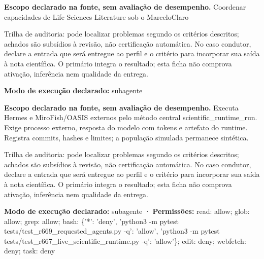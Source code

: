 \begin{descricao}
\textbf{Escopo declarado na fonte, sem avaliação de desempenho.}
Coordenar capacidades de Life Sciences Literature sob o MarceloClaro
\end{descricao}

\begin{funcao}
Trilha de auditoria: pode localizar problemas segundo os critérios descritos; achados são subsídios à revisão, não certificação automática. No caso condutor, declare a entrada que será entregue ao perfil e o critério para incorporar sua saída à nota científica. O primário integra o resultado; esta ficha não comprova ativação, inferência nem qualidade da entrega.
\end{funcao}

\begin{arquitetura}
\textbf{Modo de execução declarado:} subagente
\end{arquitetura}


\begin{descricao}
\textbf{Escopo declarado na fonte, sem avaliação de desempenho.}
Executa Hermes e MiroFish/OASIS externos pelo método central scientific\_runtime\_run. Exige processo externo, resposta do modelo com tokens e artefato do runtime. Registra commits, hashes e limites; a população simulada permanece sintética.
\end{descricao}

\begin{funcao}
Trilha de auditoria: pode localizar problemas segundo os critérios descritos; achados são subsídios à revisão, não certificação automática. No caso condutor, declare a entrada que será entregue ao perfil e o critério para incorporar sua saída à nota científica. O primário integra o resultado; esta ficha não comprova ativação, inferência nem qualidade da entrega.
\end{funcao}

\begin{arquitetura}
\textbf{Modo de execução declarado:} subagente · \textbf{Permissões:} read: allow; glob: allow; grep: allow; bash: \{'*': 'deny', 'python3 -m pytest tests/test\_r669\_requested\_agents.py -q': 'allow', 'python3 -m pytest tests/test\_r667\_live\_scientific\_runtime.py -q': 'allow'\}; edit: deny; webfetch: deny; task: deny
\end{arquitetura}


